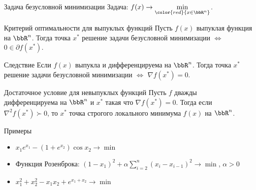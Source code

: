 \documentclass[12pt,russian]{beamer}
\begin{document}
\begin{frame}{Задача безусловной минимизации}
Задача: $f(x) \rightarrow \min\limits_{\color{red}{x \in \bbR^n}}$.

\begin{block}{Критерий оптимальности для выпуклых функций}
Пусть $f(x)$ выпуклая функция на $\bbR^n$. 
Тогда точка $x^*$ решение задачи безусловной минимизации $\Leftrightarrow$ $0 \in \partial f(x^*)$.
\end{block}

\begin{block}{Следствие}
Если $f(x)$ выпукла и дифференцируема на $\bbR^n$.
Тогда точка $x^*$ решение задачи безусловной минимизации $\Leftrightarrow$ $\nabla f(x^*) = 0$.
\end{block}

\begin{block}{Достаточное условие для невыпуклых функций}
Пусть $f$ дважды дифференцируема на $\bbR^n$ и $x^*$ такая что $\nabla f(x^*) = 0$. 
Тогда если $\nabla^2 f(x^*) \succ 0$, то $x^*$ точка строгого локального минимума $f(x)$ на $\bbR^n$.  
\end{block}

\end{frame}

\begin{frame}{Примеры}
\begin{itemize}
\item $x_1e^{x_1} - (1 + e^{x_2})\cos x_2 \rightarrow \min$
\item Функция Розенброка: $(1 - x_1)^2 + \alpha \sum\limits_{i = 2}^n (x_i - x_{i-1})^2 \rightarrow \min$, $\alpha > 0$
\item $x^2_1 + x^2_2 - x_1x_2 + e^{x_1 + x_2} \rightarrow \min$
\end{itemize}
\end{frame}
\end{document}
